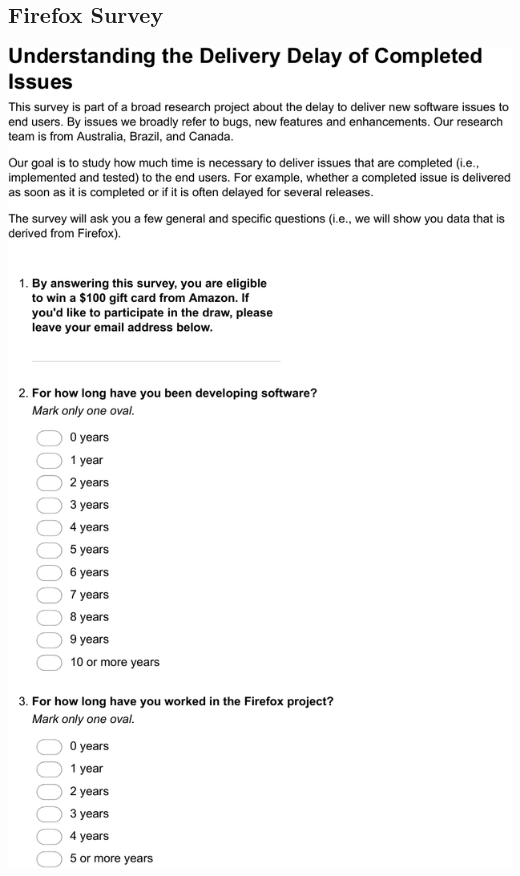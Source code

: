 \documentclass[
	12pt,				%
	openright,			%
	oneside,			%
	a4paper,			%
	french,				%
	spanish,			%
	brazil,				%
	english
	]{abntex2}
\newcounter{pt}
\newcounter{th}
\begin{document}
\begin{apendicesenv}
%
\partapendices

\chapter{Firefox Survey}\label{appendix:a}

\includegraphics[width=.8\textwidth,keepaspectratio]{chapters/chapter5/appendix/Firefox1.pdf}


\end{apendicesenv}
\end{document}
